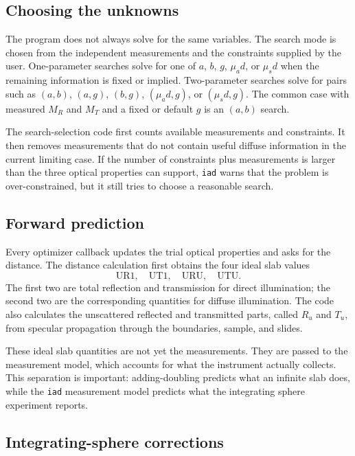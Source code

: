 \documentclass{article}
\newcommand\iadprog{\texttt{iad}}
\begin{document}
\subsection{Choosing the unknowns}

The program does not always solve for the same variables.  The search mode is
chosen from the independent measurements and the constraints supplied by the
user.  One-parameter searches solve for one of $a$, $b$, $g$, $\mu_a d$, or
$\mu_s d$ when the remaining information is fixed or implied.  Two-parameter
searches solve for pairs such as $(a,b)$, $(a,g)$, $(b,g)$,
$(\mu_a d,g)$, or $(\mu_s d,g)$.  The common case with measured $M_R$ and
$M_T$ and a fixed or default $g$ is an $(a,b)$ search.

The search-selection code first counts available measurements and constraints.
It then removes measurements that do not contain useful diffuse information in
the current limiting case.  If the number of constraints plus measurements is
larger than the three optical properties can support, \iadprog{} warns that the
problem is over-constrained, but it still tries to choose a reasonable search.

\subsection{Forward prediction}

Every optimizer callback updates the trial optical properties and asks for the
distance.  The distance calculation first obtains the four ideal slab values
\[
  \mathrm{UR1},\quad \mathrm{UT1},\quad \mathrm{URU},\quad \mathrm{UTU}.
\]
The first two are total reflection and transmission for direct illumination;
the second two are the corresponding quantities for diffuse illumination.
The code also calculates the unscattered reflected and transmitted parts,
called $R_u$ and $T_u$, from specular propagation through the boundaries,
sample, and slides.

These ideal slab quantities are not yet the measurements.  They are passed to
the measurement model, which accounts for what the instrument actually collects.
This separation is important: adding-doubling predicts what an infinite slab
does, while the \iadprog{} measurement model predicts what the integrating
sphere experiment reports.

\subsection{Integrating-sphere corrections}
\end{document}
